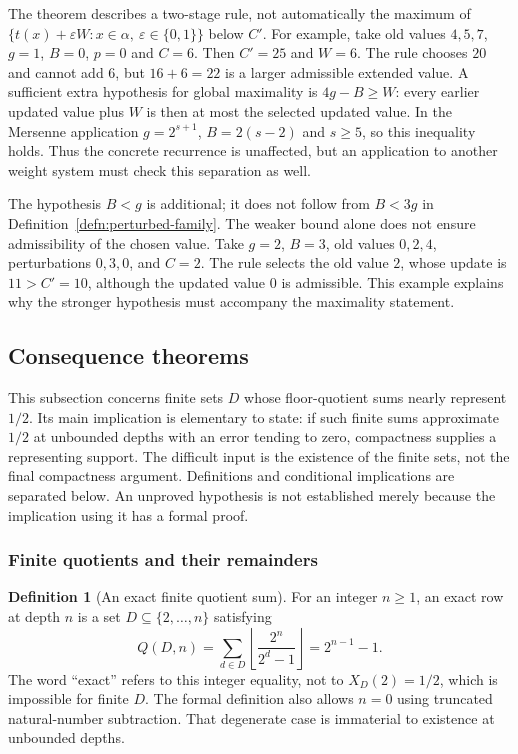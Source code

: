 \documentclass[11pt]{article}
\theoremstyle{plain}
\theoremstyle{definition}
\newtheorem{defn}[thm]{Definition}
\theoremstyle{remark}
\newcommand{\lean}[2]{\leanlink{#2}}
\begin{document}
The theorem describes a two-stage rule, not automatically the maximum
of $\{t(x)+\varepsilon W:x\in\alpha,\ \varepsilon\in\{0,1\}\}$
below $C'$.  For example, take old values $4,5,7$, $g=1$, $B=0$,
$p=0$ and $C=6$.  Then $C'=25$ and $W=6$.  The rule chooses
$20$ and cannot add $6$, but $16+6=22$ is a larger admissible
extended value.  A sufficient extra hypothesis for global maximality
is $4g-B\ge W$: every earlier updated value plus $W$ is then at
most the selected updated value.  In the Mersenne application
$g=2^{s+1}$, $B=2(s-2)$ and $s\ge5$, so this inequality holds.
Thus the concrete recurrence is unaffected, but an application to
another weight system must check this separation as well.

The hypothesis $B<g$ is additional; it does not follow from
$B<3g$ in Definition~\ref{defn:perturbed-family}.
The weaker bound alone does not ensure admissibility of the chosen value.
Take $g=2$, $B=3$, old values $0,2,4$, perturbations $0,3,0$, and $C=2$.
The rule selects the old value $2$, whose update is $11>C'=10$,
although the updated value $0$ is admissible.
This example explains why the stronger hypothesis must accompany
the maximality statement.
\subsection{Consequence theorems}

This subsection concerns finite sets $D$ whose floor-quotient sums nearly
represent $1/2$.  Its main implication is elementary to state: if such
finite sums approximate $1/2$ at unbounded depths with an error tending to
zero, compactness supplies a representing support.  The difficult input
is the existence of the finite sets, not the final compactness argument.
Definitions and conditional implications are separated below.  An
unproved hypothesis is not established merely because the
implication using it has a formal proof.

\subsubsection*{Finite quotients and their remainders}

\begin{defn}[An exact finite quotient sum]\label{record:257bm-d1}
For an integer $n\ge1$, an exact row at depth $n$ is a set
$D\subseteq\{2,\ldots,n\}$ satisfying
\[
 Q(D,n)=\sum_{d\in D}\left\lfloor\frac{2^n}{2^d-1}\right\rfloor
       =2^{n-1}-1.
\]
The word ``exact'' refers to this integer equality, not to
$X_D(2)=1/2$, which is impossible for finite $D$.
The formal definition also allows $n=0$ using truncated
natural-number subtraction.  That degenerate case is immaterial
to existence at unbounded depths.
\par\noindent   \lean{ExactLocalMersenneHalfRow}{BooleanMobiusCofinalExactRows.lean:31}
\end{defn}
\end{document}
